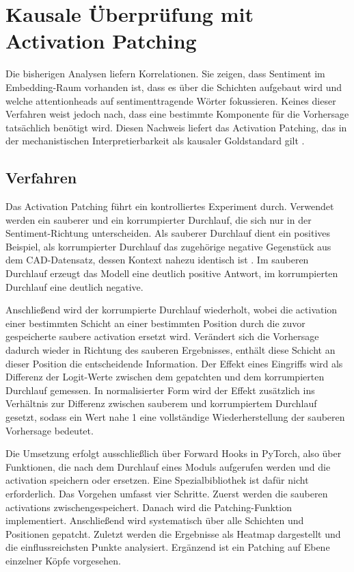 \section{Kausale Überprüfung mit Activation Patching}

Die bisherigen Analysen liefern Korrelationen. Sie zeigen, dass Sentiment im Embedding-Raum vorhanden ist, dass es über die Schichten aufgebaut wird und welche \glspl{attentionhead} auf sentimenttragende Wörter fokussieren. Keines dieser Verfahren weist jedoch nach, dass eine bestimmte Komponente für die Vorhersage tatsächlich benötigt wird. Diesen Nachweis liefert das Activation Patching, das in der mechanistischen Interpretierbarkeit als kausaler Goldstandard gilt \cite{meng2022locating, goldowskydill2023localizing}.

\subsection{Verfahren}

Das Activation Patching führt ein kontrolliertes Experiment durch. Verwendet werden ein sauberer und ein korrumpierter Durchlauf, die sich nur in der Sentiment-Richtung unterscheiden. Als sauberer Durchlauf dient ein positives Beispiel, als korrumpierter Durchlauf das zugehörige negative Gegenstück aus dem CAD-Datensatz, dessen Kontext nahezu identisch ist \cite{kaushik2020learning}. Im sauberen Durchlauf erzeugt das Modell eine deutlich positive Antwort, im korrumpierten Durchlauf eine deutlich negative.

Anschließend wird der korrumpierte Durchlauf wiederholt, wobei die \gls{activation} einer bestimmten Schicht an einer bestimmten Position durch die zuvor gespeicherte saubere \gls{activation} ersetzt wird. Verändert sich die Vorhersage dadurch wieder in Richtung des sauberen Ergebnisses, enthält diese Schicht an dieser Position die entscheidende Information. Der Effekt eines Eingriffs wird als Differenz der Logit-Werte zwischen dem gepatchten und dem korrumpierten Durchlauf gemessen. In normalisierter Form wird der Effekt zusätzlich ins Verhältnis zur Differenz zwischen sauberem und korrumpiertem Durchlauf gesetzt, sodass ein Wert nahe 1 eine vollständige Wiederherstellung der sauberen Vorhersage bedeutet.

Die Umsetzung erfolgt ausschließlich über Forward Hooks in PyTorch, also über Funktionen, die nach dem Durchlauf eines Moduls aufgerufen werden und die \gls{activation} speichern oder ersetzen. Eine Spezialbibliothek ist dafür nicht erforderlich. Das Vorgehen umfasst vier Schritte. Zuerst werden die sauberen \glspl{activation} zwischengespeichert. Danach wird die Patching-Funktion implementiert. Anschließend wird systematisch über alle Schichten und Positionen gepatcht. Zuletzt werden die Ergebnisse als Heatmap dargestellt und die einflussreichsten Punkte analysiert. Ergänzend ist ein Patching auf Ebene einzelner Köpfe vorgesehen.

